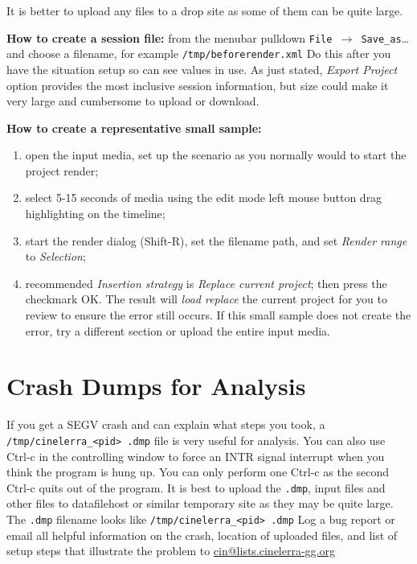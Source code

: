 It is better to upload any files to a drop site as some of them can be quite large.

\textbf{How to create a session file:} \quad from the menubar pulldown \texttt{File $\rightarrow $ Save\_as}{\dots} \quad and choose a filename, for example \texttt{/tmp/beforerender.xml} Do this after you have the situation setup so can see values in use. As just stated, \textit{Export Project} option provides the most inclusive session information, but size could make it very large and cumbersome to upload or download.

\textbf{How to create a representative small sample:}

\begin{enumerate}[nosep]
	\item open the input media, set up the scenario as you normally would to start the project render;
	\item select 5-15 seconds of media using the edit mode left mouse button drag highlighting on the timeline;
	\item start the render dialog (Shift-R), set the filename path, and set \textit{Render range} to \textit{Selection};
	\item recommended \textit{Insertion strategy} is \textit{Replace current project}; then press the checkmark OK. The result will \textit{load replace} the current project for you to review to ensure the error still occurs. If this small sample does not create the error, try a different section or upload the entire input media.
\end{enumerate}


\section{Crash Dumps for Analysis}%
\label{cha:crash_dumps_analysis}
If you get a SEGV crash and can explain what steps you took, a \texttt{/tmp/cinelerra\_<pid> .dmp} file is
very useful for analysis. You can also use Ctrl-c in the controlling window to force an INTR signal interrupt when
you think the program is hung up. You can only perform one Ctrl-c as the second Ctrl-c quits out of the program. It
is best to upload the \texttt{.dmp}, input files and other files to datafilehost or similar temporary site as they may be quite large. The \texttt{.dmp} filename looks like \texttt{/tmp/cinelerra\_<pid> .dmp} Log a bug report or email all
helpful information on the crash, location of uploaded files, and list of setup steps that illustrate the problem to
{\small \href{mailto:cin@lists.cinelerra-gg.org}{cin@lists.cinelerra-gg.org}}

